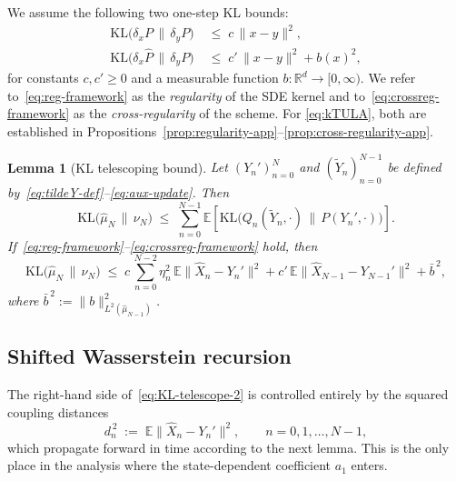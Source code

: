 \documentclass[11pt,a4paper,reqno]{amsart}
\theoremstyle{plain}
\newtheorem{lemma}{Lemma}
\theoremstyle{definition}
\theoremstyle{remark}
\newcommand{\R}{\mathbb{R}}
\newcommand{\E}{\mathbb{E}}
\newcommand{\KL}{\mathrm{KL}}
\begin{document}
We assume the following two one-step KL bounds:
\begin{align}
  \KL\!\bigl(\delta_x P\,\|\,\delta_y P\bigr)
  &\;\le\; c\,\|x-y\|^2,
  \label{eq:reg-framework}\\[2pt]
  \KL\!\bigl(\delta_x \widehat P\,\|\,\delta_y P\bigr)
  &\;\le\; c'\,\|x-y\|^2 + b(x)^2,
  \label{eq:crossreg-framework}
\end{align}
for constants $c,c'\ge0$ and a measurable function
$b:\R^d\to[0,\infty)$. We refer to~\eqref{eq:reg-framework} as the
\emph{regularity} of the SDE kernel and
to~\eqref{eq:crossreg-framework} as the \emph{cross-regularity} of
the scheme. For \ref{eq:kTULA}, both are established in
Propositions~\ref{prop:regularity-app}--\ref{prop:cross-regularity-app}.

\begin{lemma}[KL telescoping bound]
\label{lem:KL-telescoping}
Let $(Y_n')_{n=0}^N$ and $(\widetilde Y_n)_{n=0}^{N-1}$ be defined
by~\eqref{eq:tildeY-def}--\eqref{eq:aux-update}. Then
\begin{equation}\label{eq:KL-telescope-1}
  \KL\!\bigl(\widehat\mu_N\,\|\,\nu_N\bigr)
  \;\le\;
  \sum_{n=0}^{N-1}
  \E\!\left[
    \KL\!\bigl(Q_n(\widetilde Y_n,\cdot)\,\big\|\,P(Y_n',\cdot)\bigr)
  \right].
\end{equation}
If~\eqref{eq:reg-framework}--\eqref{eq:crossreg-framework} hold, then
\begin{equation}\label{eq:KL-telescope-2}
  \KL\!\bigl(\widehat\mu_N\,\|\,\nu_N\bigr)
  \;\le\;
  c\,\sum_{n=0}^{N-2}\eta_n^{2}\,\E\|\widehat X_n-Y_n'\|^{2}
  +c'\,\E\|\widehat X_{N-1}-Y_{N-1}'\|^{2}
  +\bar b^{\,2},
\end{equation}
where $\bar b^{\,2}:=\|b\|_{L^2(\widehat\mu_{N-1})}^{2}$.
\end{lemma}

\subsection{Shifted Wasserstein recursion}
\label{subsec:framework-recursion}

The right-hand side of~\eqref{eq:KL-telescope-2} is controlled entirely
by the squared coupling distances
\begin{equation}\label{eq:dn-def}
  d_n^{\,2} \;:=\; \E\|\widehat X_n - Y_n'\|^{2},
  \qquad n=0,1,\dots,N-1,
\end{equation}
which propagate forward in time according to the next lemma. This is
the only place in the analysis where the state-dependent coefficient
$a_1$ enters.
\end{document}
